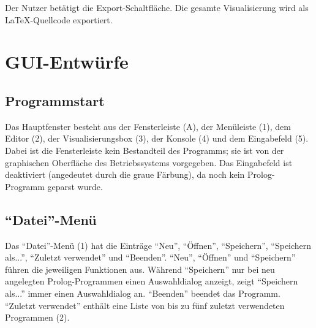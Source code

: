 \documentclass[parskip=full,11pt,twoside]{scrartcl}
\begin{document}
{Der Nutzer betätigt die Export-Schaltfläche.}
{Die gesamte Visualisierung wird als LaTeX-Quellcode exportiert.}

\pagebreak
\appendix

\section{GUI-Entwürfe}

\subsection{Programmstart}

\begin{minipage}{\linewidth}
\end{minipage}

Das Hauptfenster besteht aus der Fensterleiste (A), der Menüleiste (1), dem Editor (2), der Visualisierungsbox (3), der Konsole (4) und dem Eingabefeld (5).
Dabei ist die Fensterleiste kein Bestandteil des Programms; sie ist von der graphischen Oberfläche des Betriebssystems vorgegeben.
Das Eingabefeld ist deaktiviert (angedeutet durch die graue Färbung), da noch kein Prolog-Programm geparst wurde.

\subsection{\enquote{Datei}-Menü}

\begin{minipage}{\linewidth}
\end{minipage}

Das \enquote{Datei}-Menü (1) hat die Einträge \enquote{Neu}, \enquote{Öffnen}, \enquote{Speichern}, \enquote{Speichern als...}, \enquote{Zuletzt verwendet} und \enquote{Beenden}.
\enquote{Neu}, \enquote{Öffnen} und \enquote{Speichern} führen die jeweiligen Funktionen aus.
Während \enquote{Speichern} nur bei neu angelegten Prolog-Programmen einen Auswahldialog anzeigt, zeigt \enquote{Speichern als...} immer einen Auswahldialog an.
\enquote{Beenden} beendet das Programm.
\enquote{Zuletzt verwendet} enthält eine Liste von bis zu fünf zuletzt verwendeten Programmen (2).
\end{document}
